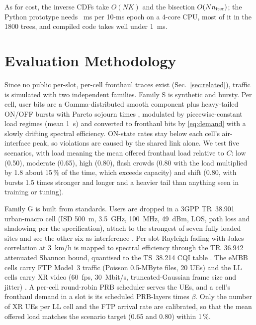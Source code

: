 \documentclass[conference]{IEEEtran}
\begin{document}
As for cost, the inverse CDFs take $O(NK)$ and the bisection $O(N n_{\rm iter})$; the Python prototype needs \dtproposed{}~ms per 10-ms epoch on a 4-core CPU, most of it in the 1800 trees, and compiled code takes well under 1~ms.

\section{Evaluation Methodology}
\label{sec:eval}
Since no public per-slot, per-cell fronthaul traces exist (Sec.~\ref{sec:related}), traffic is simulated with two independent families. Family S is synthetic and bursty. Per cell, user bits are a Gamma-distributed smooth component plus heavy-tailed ON/OFF bursts with Pareto sojourn times \cite{willinger1997}, modulated by piecewise-constant load regimes (mean 1~s) and converted to fronthaul bits by \eqref{eq:demand} with a slowly drifting spectral efficiency. ON-state rates stay below each cell's air-interface peak, so violations are caused by the shared link alone. We test five scenarios, with load meaning the mean offered fronthaul load relative to $C$: low (0.50), moderate (0.65), high (0.80), flash crowds (0.80 with the load multiplied by 1.8 about 15\,\% of the time, which exceeds capacity) and shift (0.80, with bursts 1.5 times stronger and longer and a heavier tail than anything seen in training or tuning).

Family G is built from standards. Users are dropped in a 3GPP TR~38.901 urban-macro cell (ISD 500~m, 3.5~GHz, 100~MHz, 49~dBm, LOS, path loss and shadowing per the specification), attach to the strongest of seven fully loaded sites and see the other six as interference \cite{tr38901}. Per-slot Rayleigh fading with Jakes correlation at 3~km/h is mapped to spectral efficiency through the TR~36.942 attenuated Shannon bound, quantised to the TS~38.214 CQI table \cite{tr36942,ts38214}. The eMBB cells carry FTP Model~3 traffic (Poisson 0.5-MByte files, 20 UEs) \cite{tr36814} and the LL cells carry XR video (60~fps, 30~Mbit/s, truncated-Gaussian frame size and jitter) \cite{tr38838}. A per-cell round-robin PRB scheduler serves the UEs, and a cell's fronthaul demand in a slot is its scheduled PRB-layers times $\beta$. Only the number of XR UEs per LL cell and the FTP arrival rate are calibrated, so that the mean offered load matches the scenario target (0.65 and 0.80) within 1\,\%.
\end{document}

